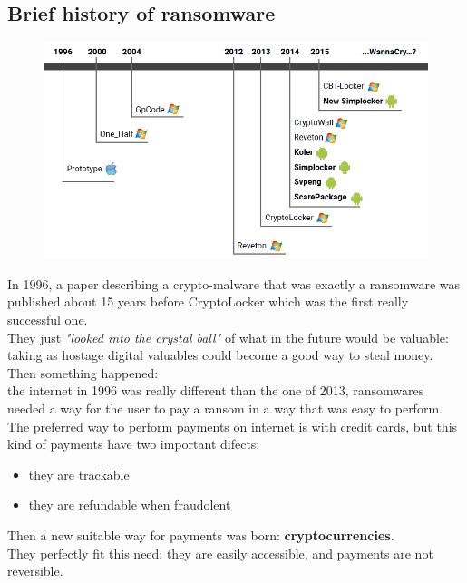         \subsection{Brief history of ransomware}
            \begin{figure}[ht!]
                \centering
                \includegraphics[width=0.40\linewidth]{ransomware_history.png}
            \end{figure}
            In 1996, a paper describing a crypto-malware that was exactly a ransomware was published about 15 years before CryptoLocker which was the first really successful one.\\
            They just \textit{"looked into the crystal ball"} of what in the future would be valuable: taking as hostage digital valuables could become a good way to steal money.\\
            Then something happened:\\
            the internet in 1996 was really different than the one of 2013, ransomwares needed a way for the user to pay a ransom in a way that was easy to perform.
            The preferred way to perform payments on internet is with credit cards, but this kind of payments have two important difects:
            \begin{itemize}
                \item they are trackable
                \item they are refundable when fraudolent
            \end{itemize}
            Then a new suitable way for payments was born: \textbf{cryptocurrencies}.\\
            They perfectly fit this need: they are easily accessible, and payments are not reversible.
